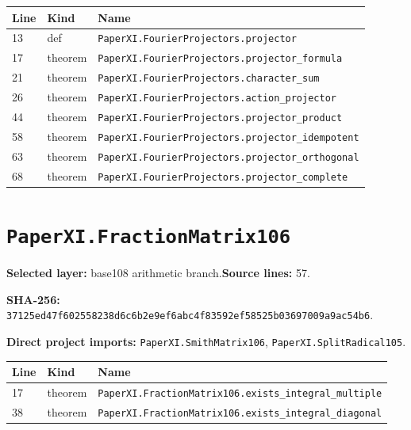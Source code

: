 \documentclass[10pt,oneside]{book}
\begin{document}
\begin{longtable}{@{}p{}p{}p{}@{}}\toprule Line&Kind&Name\\\midrule\endhead

13&def&\nolinkurl{PaperXI.FourierProjectors.projector}\\

17&theorem&\nolinkurl{PaperXI.FourierProjectors.projector_formula}\\

21&theorem&\nolinkurl{PaperXI.FourierProjectors.character_sum}\\

26&theorem&\nolinkurl{PaperXI.FourierProjectors.action_projector}\\

44&theorem&\nolinkurl{PaperXI.FourierProjectors.projector_product}\\

58&theorem&\nolinkurl{PaperXI.FourierProjectors.projector_idempotent}\\

63&theorem&\nolinkurl{PaperXI.FourierProjectors.projector_orthogonal}\\

68&theorem&\nolinkurl{PaperXI.FourierProjectors.projector_complete}\\

\bottomrule\end{longtable}

\section{\texorpdfstring{\nolinkurl{PaperXI.FractionMatrix106}}{PaperXI.FractionMatrix106}}\label{module:PaperXI.FractionMatrix106}

\textbf{Selected layer:} base108 arithmetic branch.\quad\textbf{Source lines:} 57.\par\textbf{SHA-256:} {\scriptsize\nolinkurl{37125ed47f602558238d6c6b2e9ef6abc4f83592ef58525b03697009a9ac54b6}}.


\textbf{Direct project imports:} \nolinkurl{PaperXI.SmithMatrix106}, \nolinkurl{PaperXI.SplitRadical105}.

\begin{longtable}{@{}p{}p{}p{}@{}}\toprule Line&Kind&Name\\\midrule\endhead

17&theorem&\nolinkurl{PaperXI.FractionMatrix106.exists_integral_multiple}\\

38&theorem&\nolinkurl{PaperXI.FractionMatrix106.exists_integral_diagonal}\\

\bottomrule\end{longtable}
\end{document}
